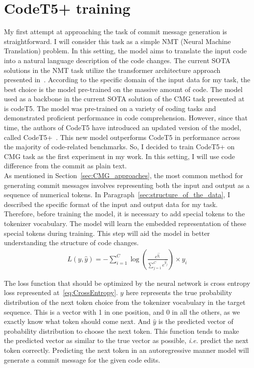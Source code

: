 \section{CodeT5+ training}\label{sec:codeT5_train}
My first attempt at approaching the task of commit message generation is straightforward. I will consider this task as a simple NMT (Neural Machine Translation) problem. In this setting, the model aims to translate the input code into a natural language description of the code changes. The current SOTA solutions in the NMT task utilize the transformer architecture approach presented in~\cite{vaswani2017attention}. According to the specific domain of the input data for my task, the best choice is the model pre-trained on the massive amount of code. The model used as a backbone in the current SOTA solution of the CMG task presented at~{}\cite{eliseeva2023commit} is codeT5. The model was pre-trained on a variety of coding tasks and demonstrated proficient performance in code comprehension. However, since that time, the authors of CodeT5 have introduced an updated version of the model, called CodeT5+~\cite{wang2023codet5+}. This new model outperforms CodeT5 in performance across the majority of code-related benchmarks. So, I decided to train CodeT5+ on CMG task as the first experiment in my work. In this setting, I will use code difference from the commit as plain text. \\
As mentioned in Section~\ref{sec:CMG_approaches}, the most common method for generating commit messages involves representing both the input and output as a sequence of numerical tokens. In Paragraph~\ref{sec:structure_of_the_data}, I described the specific format of the input and output data for my task. Therefore, before training the model, it is necessary to add special tokens to the tokenizer vocabulary. The model will learn the embedded representation of these special tokens during training. This step will aid the model in better understanding the structure of code changes.
\begin{align}
    \label{eq:CrossEntropy}
    L(y, \hat{y}) = -\sum_{i=1}^{C} \log \left( \frac{e^{\hat{y_i}}}{\sum_{j=1}^{C} e^{\hat{y_{j}}}} \right) \times y_{i}
\end{align}

The loss function that should be optimized by the neural network is cross entropy loss represented at~\ref{eq:CrossEntropy}. $y$ here represents the true probability distribution of the next token choice from the tokenizer vocabulary in the target sequence. This is a vector with 1 in one position, and 0 in all the others, as we exactly know what token should come next. And $\hat{y}$ is the predicted vector of probability distribution to choose the next token.  This function tends to make the predicted vector as similar to the true vector as possible, \textit{i.e.} predict the next token correctly. Predicting the next token in an autoregressive manner model will generate a commit message for the given code edits. 

